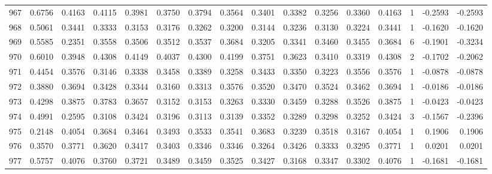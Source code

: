 \begin{tabular}{lrrrrrrrrrrrrrrr}
967 &      0.6756 &  0.4163 &  0.4115 &  0.3981 &  0.3750 &  0.3794 &  0.3564 &  0.3401 &  0.3382 &  0.3256 &   0.3360 &     0.4163 &      1 &                   -0.2593 &                    -0.2593 \\
968 &      0.5061 &  0.3441 &  0.3333 &  0.3153 &  0.3176 &  0.3262 &  0.3200 &  0.3144 &  0.3236 &  0.3130 &   0.3224 &     0.3441 &      1 &                   -0.1620 &                    -0.1620 \\
969 &      0.5585 &  0.2351 &  0.3558 &  0.3506 &  0.3512 &  0.3537 &  0.3684 &  0.3205 &  0.3341 &  0.3460 &   0.3455 &     0.3684 &      6 &                   -0.1901 &                    -0.3234 \\
970 &      0.6010 &  0.3948 &  0.4308 &  0.4149 &  0.4037 &  0.4300 &  0.4199 &  0.3751 &  0.3623 &  0.3410 &   0.3319 &     0.4308 &      2 &                   -0.1702 &                    -0.2062 \\
971 &      0.4454 &  0.3576 &  0.3146 &  0.3338 &  0.3458 &  0.3389 &  0.3258 &  0.3433 &  0.3350 &  0.3223 &   0.3556 &     0.3576 &      1 &                   -0.0878 &                    -0.0878 \\
972 &      0.3880 &  0.3694 &  0.3428 &  0.3344 &  0.3160 &  0.3313 &  0.3576 &  0.3520 &  0.3470 &  0.3524 &   0.3462 &     0.3694 &      1 &                   -0.0186 &                    -0.0186 \\
973 &      0.4298 &  0.3875 &  0.3783 &  0.3657 &  0.3152 &  0.3153 &  0.3263 &  0.3330 &  0.3459 &  0.3288 &   0.3526 &     0.3875 &      1 &                   -0.0423 &                    -0.0423 \\
974 &      0.4991 &  0.2595 &  0.3108 &  0.3424 &  0.3196 &  0.3113 &  0.3139 &  0.3352 &  0.3289 &  0.3298 &   0.3252 &     0.3424 &      3 &                   -0.1567 &                    -0.2396 \\
975 &      0.2148 &  0.4054 &  0.3684 &  0.3464 &  0.3493 &  0.3533 &  0.3541 &  0.3683 &  0.3239 &  0.3518 &   0.3167 &     0.4054 &      1 &                    0.1906 &                     0.1906 \\
976 &      0.3570 &  0.3771 &  0.3620 &  0.3417 &  0.3403 &  0.3346 &  0.3346 &  0.3264 &  0.3426 &  0.3333 &   0.3295 &     0.3771 &      1 &                    0.0201 &                     0.0201 \\
977 &      0.5757 &  0.4076 &  0.3760 &  0.3721 &  0.3489 &  0.3459 &  0.3525 &  0.3427 &  0.3168 &  0.3347 &   0.3302 &     0.4076 &      1 &                   -0.1681 &                    -0.1681 \\

\end{tabular}
